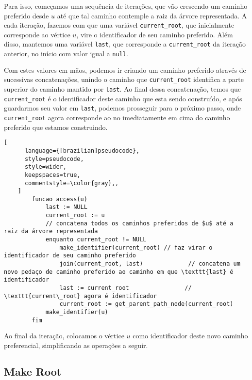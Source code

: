 Para isso, começamos uma sequência de iterações, que vão crescendo um caminho preferido desde $u$ até que tal caminho contemple a raiz da árvore representada. A cada iteração, fazemos com que uma variável \texttt{current\_root}, que inicialmente corresponde ao vértice $u$, vire o identificador de seu caminho preferido. Além disso, mantemos uma variável \texttt{last}, que corresponde a \texttt{current\_root} da iteração anterior, no início com valor igual a \texttt{null}.

Com estes valores em mãos, podemos ir criando um caminho preferido através de sucessivas concatenações, unindo o caminho que \texttt{current\_root} identifica a parte superior do caminho mantido por \texttt{last}. Ao final dessa concatenação, temos que \texttt{current\_root} é o identificador deste caminho que esta sendo construído, e após guardarmos seu valor em \texttt{last}, podemos prosseguir para o próximo passo, onde \texttt{current\_root} agora corresponde ao no imediatamente em cima do caminho preferido que estamos construindo.

\begin{programruledcaption}{\label{lct:access}}
    \begin{lstlisting}[
      language={[brazilian]pseudocode},
      style=pseudocode,
      style=wider,
      keepspaces=true,
      commentstyle=\color{gray},,
    ]
        funcao access(u)
            last := NULL
            current_root := u
            // concatena todos os caminhos preferidos de $u$ até a raiz da árvore representada
            enquanto current_root != NULL
                make_identifier(current_root) // faz virar o identificador de seu caminho preferido 
                join(current_root, last)             // concatena um novo pedaço de caminho preferido ao caminho em que \texttt{last} é identificador
                last := current_root                // \texttt{current\_root} agora é identificador
                current_root := get_parent_path_node(current_root)
            make_identifier(u)
        fim
    \end{lstlisting}
\end{programruledcaption}

Ao final da iteração, colocamos o vértice $u$ como identificador deste novo caminho preferencial, simplificando as operações a seguir.

\subsection{Make Root}
\label{subsection:lct-make-root}

